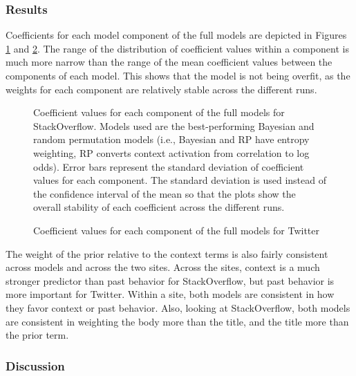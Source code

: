 \documentclass[man,floatsintext,donotrepeattitle]{apa6}
\begin{document}
\subsubsection{Results}

Coefficients for each model component of the full models are depicted in Figures \ref{figContextCoeffSO} and \ref{figContextCoeffT}.
The range of the distribution of coefficient values within a component is much more narrow than the range of the mean coefficient values between the components of each model.
This shows that the model is not being overfit, as the weights for each component are relatively stable across the different runs.

\begin{figure}[!htbp]
  \caption{
    Coefficient values for each component of the full models for StackOverflow.
    Models used are the best-performing Bayesian and random permutation models
    (i.e., Bayesian and RP have entropy weighting, RP converts context activation from correlation to log odds).
    Error bars represent the standard deviation of coefficient values for each component.
    The standard deviation is used instead of the confidence interval of the mean so that the plots show the overall stability of each coefficient across the different runs.
  }
  \label{figContextCoeffSO}
\end{figure}

\begin{figure}[!htbp]
  \caption{Coefficient values for each component of the full models for Twitter}
  \label{figContextCoeffT}
\end{figure}

The weight of the prior relative to the context terms is also fairly consistent across models and across the two sites.
Across the sites, context is a much stronger predictor than past behavior for StackOverflow, but past behavior is more important for Twitter. 
Within a site, both models are consistent in how they favor context or past behavior.
Also, looking at StackOverflow, both models are consistent in weighting the body more than the title, and the title more than the prior term.

\subsubsection{Discussion}
\end{document}
